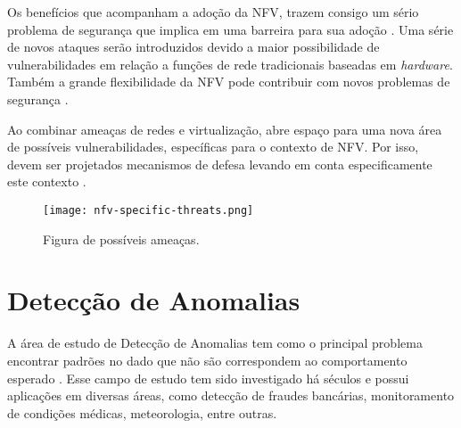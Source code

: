
Os benefícios que acompanham a adoção da NFV, trazem consigo um sério problema de segurança que implica em uma barreira para sua adoção \cite{Pattaranantakul2016} \cite{https://doi.org/10.17023/6fny-ta14}. Uma série de novos ataques serão introduzidos devido a maior possibilidade de vulnerabilidades em relação a funções de rede tradicionais baseadas em \textit{hardware}. Também a grande flexibilidade da NFV pode contribuir com novos problemas de segurança \cite{Pattaranantakul2018}. 

Ao combinar ameaças de redes e virtualização, abre espaço para uma nova área de possíveis vulnerabilidades, específicas para o contexto de NFV. Por isso, devem ser projetados mecanismos de defesa levando em conta especificamente este contexto \citep{ETSI_SEC_NFV}.


\begin{figure}[!htb]
    \centering
    \texttt{[image: nfv-specific-threats.png]}
    \caption{Figura de possíveis ameaças.}
    \label{fig:enter-label}
\end{figure}

\newpage
\section{Detecção de Anomalias}
\label{anml}
\label{anml:desafios}
A área de estudo de Detecção de Anomalias tem como o principal problema encontrar padrões no dado que não são correspondem ao comportamento esperado \space \citep{Chandola2009}. Esse campo de estudo tem sido investigado há séculos e possui aplicações em diversas áreas, como detecção de fraudes bancárias, monitoramento de condições médicas, meteorologia, entre outras.

